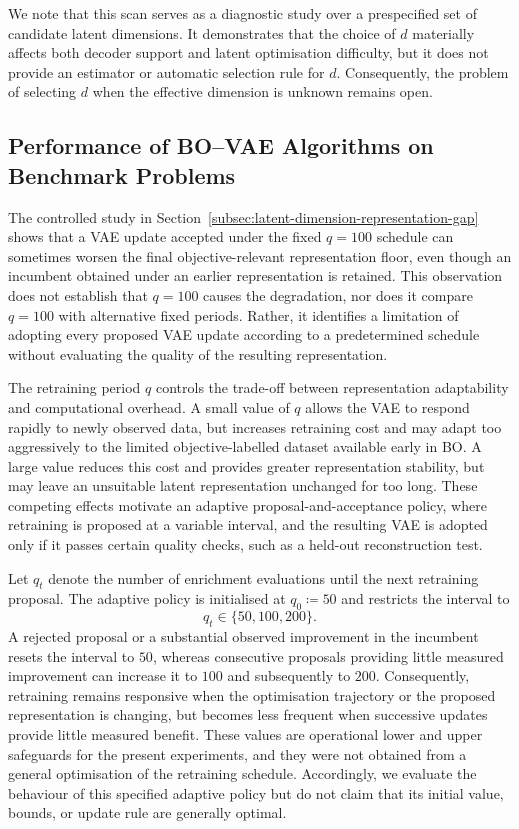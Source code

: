 \documentclass[pdflatex,sn-mathphys-num]{sn-jnl}%
\theoremstyle{thmstyleone}%
\theoremstyle{thmstyletwo}%
\theoremstyle{thmstylethree}%
\begin{document}
We note that this scan serves as a diagnostic study over a prespecified set of candidate latent dimensions. It demonstrates that the choice of $d$ materially affects both decoder support and latent optimisation difficulty, but it does not provide an estimator or automatic selection rule for \(d\). Consequently, the problem of selecting \(d\) when the effective dimension is unknown remains open.

\subsection{Performance of BO--VAE Algorithms on Benchmark Problems}
\label{sec:bovae-benchmark-performance}

The controlled study in Section~\ref{subsec:latent-dimension-representation-gap} shows that a VAE update accepted under the fixed \(q=100\) schedule can sometimes worsen the final objective-relevant representation floor, even though an incumbent obtained under an earlier representation is retained. This observation does not establish that \(q=100\) causes the degradation, nor does it compare \(q=100\) with alternative fixed periods. Rather, it identifies a limitation of adopting every proposed VAE update according to a predetermined schedule without evaluating the quality of the resulting representation.

The retraining period $q$ controls the trade-off between representation adaptability and computational overhead. A small value of $q$ allows the VAE to respond rapidly to newly observed data, but increases retraining cost and may adapt too aggressively to the limited objective-labelled dataset available early in BO. A large value reduces this cost and provides greater representation stability, but may leave an unsuitable latent representation unchanged for too long. These competing effects motivate an adaptive proposal-and-acceptance policy, where retraining is proposed at a variable interval, and the resulting VAE is adopted only if it passes certain quality checks, such as a held-out reconstruction test.

Let \(q_t\) denote the number of enrichment evaluations until the next retraining proposal. The adaptive policy is initialised at \(q_0\coloneq50\) and restricts the interval to
\[
    q_t\in\{50,100,200\}.
\]
A rejected proposal or a substantial observed improvement in the incumbent resets the interval to $50$, whereas consecutive proposals providing little measured improvement can increase it to \(100\) and subsequently to \(200\). Consequently, retraining remains responsive when the optimisation trajectory or the proposed representation is changing, but becomes less frequent when successive updates provide little measured benefit. These values are operational lower and upper safeguards for the present experiments, and they were not obtained from a general optimisation of the retraining schedule. Accordingly, we evaluate the behaviour of this specified adaptive policy but do not claim that its initial value, bounds, or update rule are generally optimal.
\end{document}
